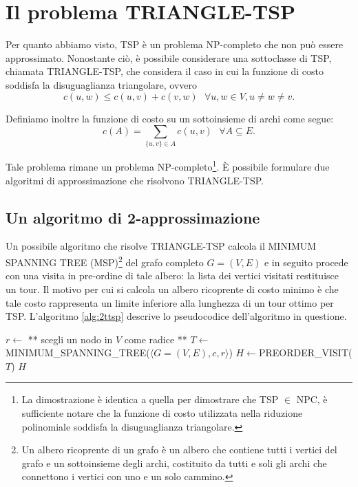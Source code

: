 \section{Il problema TRIANGLE-TSP}
Per quanto abbiamo visto, TSP è un problema NP-completo che non può essere approssimato. Nonostante ciò, è possibile considerare una sottoclasse di TSP, chiamata TRIANGLE-TSP, che considera il caso in cui la funzione di costo soddisfa la disuguaglianza triangolare, ovvero
\[
c(u,w) \leq c(u,v) + c(v,w) \,\,\,\, \forall u,w\in V, u \neq w \neq v \mbox{.}
\]

Definiamo inoltre la funzione di costo su un sottoinsieme di archi come segue:
\[
c(A)=\sum_{\{u,v\}\in A}c(u,v) \,\,\,\, \forall A \subseteq E \mbox{.}
\]

Tale problema rimane un problema NP-completo\footnote{La dimostrazione è identica a quella per dimostrare che TSP $\in$ NPC, è sufficiente notare che la funzione di costo utilizzata nella riduzione polinomiale soddisfa la disuguaglianza triangolare.}. È possibile formulare due algoritmi di approssimazione che risolvono TRIANGLE-TSP.

\subsection{Un algoritmo di 2-approssimazione}
Un possibile algoritmo che risolve TRIANGLE-TSP calcola il MINIMUM SPANNING TREE (MSP)\footnote{Un albero ricoprente di un grafo è un albero che contiene tutti i vertici del grafo e un sottoinsieme degli archi, costituito da tutti e soli gli archi che connettono i vertici con uno e un solo cammino.} del grafo completo $G=(V,E)$ e in seguito procede con una visita in pre-ordine di tale albero: la lista dei vertici visitati restituisce un tour. Il motivo per cui si calcola un albero ricoprente di costo minimo è che tale costo rappresenta un limite inferiore alla lunghezza di un tour ottimo per TSP. L'algoritmo \ref{alg:2ttsp} descrive lo pseudocodice dell'algoritmo in questione.

\begin{algorithm}
\caption{Algoritmo di 2-approssimazione per TRIANGLE-TSP}
\label{alg:2ttsp}
\begin{algorithmic}
	\State $r \gets$ ** scegli un nodo in $V$ come radice **
	\State $T \gets $MINIMUM\_SPANNING\_TREE($\langle G=(V,E), c, r \rangle$)
	\State $H \gets $PREORDER\_VISIT($T$)
	\State \Return $H$
\EndFunction
\end{algorithmic}
\end{algorithm}

